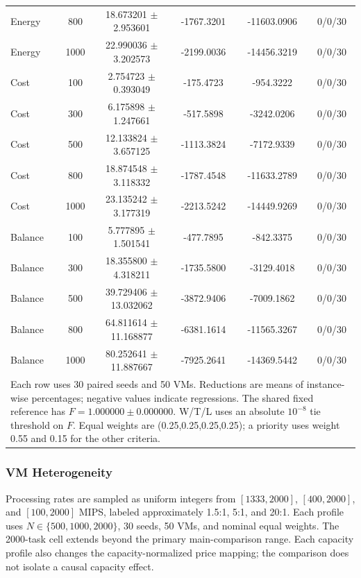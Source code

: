 \begin{table}[!htbp]
{\begin{tabular}{l c c c c c}
Energy & 800 & 18.673201 $\pm$ 2.953601 & -1767.3201 & -11603.0906 & 0/0/30 \\
Energy & 1000 & 22.990036 $\pm$ 3.202573 & -2199.0036 & -14456.3219 & 0/0/30 \\
Cost & 100 & 2.754723 $\pm$ 0.393049 & -175.4723 & -954.3222 & 0/0/30 \\
Cost & 300 & 6.175898 $\pm$ 1.247661 & -517.5898 & -3242.0206 & 0/0/30 \\
Cost & 500 & 12.133824 $\pm$ 3.657125 & -1113.3824 & -7172.9339 & 0/0/30 \\
Cost & 800 & 18.874548 $\pm$ 3.118332 & -1787.4548 & -11633.2789 & 0/0/30 \\
Cost & 1000 & 23.135242 $\pm$ 3.177319 & -2213.5242 & -14449.9269 & 0/0/30 \\
Balance & 100 & 5.777895 $\pm$ 1.501541 & -477.7895 & -842.3375 & 0/0/30 \\
Balance & 300 & 18.355800 $\pm$ 4.318211 & -1735.5800 & -3129.4018 & 0/0/30 \\
Balance & 500 & 39.729406 $\pm$ 13.032062 & -3872.9406 & -7009.1862 & 0/0/30 \\
Balance & 800 & 64.811614 $\pm$ 11.168877 & -6381.1614 & -11565.3267 & 0/0/30 \\
Balance & 1000 & 80.252641 $\pm$ 11.887667 & -7925.2641 & -14369.5442 & 0/0/30 \\
\bottomrule
\multicolumn{6}{p{.97\textwidth}}{\footnotesize Each row uses 30 paired seeds and 50 VMs. Reductions are means of instance-wise percentages; negative values indicate regressions. The shared fixed reference has $F=1.000000\pm0.000000$. W/T/L uses an absolute $10^{-8}$ tie threshold on $F$. Equal weights are (0.25,0.25,0.25,0.25); a priority uses weight 0.55 and 0.15 for the other criteria.}\\
\end{tabular}
}
\end{table}

\FloatBarrier
\subsubsection{VM Heterogeneity}\label{sec:vm_heterogeneity}
Processing rates are sampled as uniform integers from $[1333,2000]$, $[400,2000]$, and $[100,2000]$ MIPS, labeled approximately 1.5:1, 5:1, and 20:1. Each profile uses $N\in\{500,1000,2000\}$, 30 seeds, 50 VMs, and nominal equal weights. The 2000-task cell extends beyond the primary main-comparison range. Each capacity profile also changes the capacity-normalized price mapping; the comparison does not isolate a causal capacity effect.

